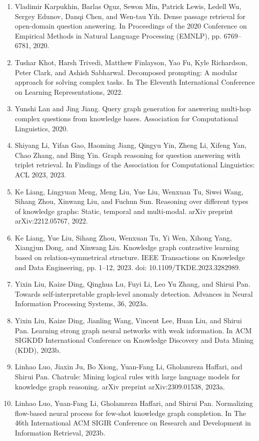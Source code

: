 \documentclass[11pt,UTF8,fontset=fandol]{ctexart}
\begin{document}
\begin{enumerate}[leftmargin=2em]
\item Vladimir Karpukhin, Barlas Oguz, Sewon Min, Patrick Lewis, Ledell Wu, Sergey Edunov, Danqi Chen, and Wen-tau Yih. Dense passage retrieval for open-domain question answering. In Proceedings of the 2020 Conference on Empirical Methods in Natural Language Processing (EMNLP), pp. 6769--6781, 2020.
\item Tushar Khot, Harsh Trivedi, Matthew Finlayson, Yao Fu, Kyle Richardson, Peter Clark, and Ashish Sabharwal. Decomposed prompting: A modular approach for solving complex tasks. In The Eleventh International Conference on Learning Representations, 2022.
\item Yunshi Lan and Jing Jiang. Query graph generation for answering multi-hop complex questions from knowledge bases. Association for Computational Linguistics, 2020.
\item Shiyang Li, Yifan Gao, Haoming Jiang, Qingyu Yin, Zheng Li, Xifeng Yan, Chao Zhang, and Bing Yin. Graph reasoning for question answering with triplet retrieval. In Findings of the Association for Computational Linguistics: ACL 2023, 2023.
\item Ke Liang, Lingyuan Meng, Meng Liu, Yue Liu, Wenxuan Tu, Siwei Wang, Sihang Zhou, Xinwang Liu, and Fuchun Sun. Reasoning over different types of knowledge graphs: Static, temporal and multi-modal. arXiv preprint arXiv:2212.05767, 2022.
\item Ke Liang, Yue Liu, Sihang Zhou, Wenxuan Tu, Yi Wen, Xihong Yang, Xiangjun Dong, and Xinwang Liu. Knowledge graph contrastive learning based on relation-symmetrical structure. IEEE Transactions on Knowledge and Data Engineering, pp. 1--12, 2023. doi: 10.1109/TKDE.2023.3282989.
\item Yixin Liu, Kaize Ding, Qinghua Lu, Fuyi Li, Leo Yu Zhang, and Shirui Pan. Towards self-interpretable graph-level anomaly detection. Advances in Neural Information Processing Systems, 36, 2023a.
\item Yixin Liu, Kaize Ding, Jianling Wang, Vincent Lee, Huan Liu, and Shirui Pan. Learning strong graph neural networks with weak information. In ACM SIGKDD International Conference on Knowledge Discovery and Data Mining (KDD), 2023b.
\item Linhao Luo, Jiaxin Ju, Bo Xiong, Yuan-Fang Li, Gholamreza Haffari, and Shirui Pan. Chatrule: Mining logical rules with large language models for knowledge graph reasoning. arXiv preprint arXiv:2309.01538, 2023a.
\item Linhao Luo, Yuan-Fang Li, Gholamreza Haffari, and Shirui Pan. Normalizing flow-based neural process for few-shot knowledge graph completion. In The 46th International ACM SIGIR Conference on Research and Development in Information Retrieval, 2023b.

\end{enumerate}
\end{document}
